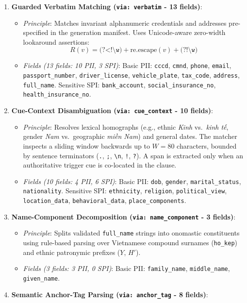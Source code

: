 \documentclass[
]{article}
\providecommand{\tightlist}{%
  \setlength{\itemsep}{0pt}\setlength{\parskip}{0pt}}
\begin{document}
\begin{enumerate}
\def\labelenumi{\arabic{enumi}.}
\tightlist
\item
  \textbf{Guarded Verbatim Matching (\texttt{via:\ verbatim} - 13
  fields)}:

  \begin{itemize}
  \tightlist
  \item
    \emph{Principle}: Matches invariant alphanumeric credentials and
    addresses pre-specified in the generation manifest. Uses
    Unicode-aware zero-width lookaround assertions:
    \[R(v) = \texttt{(?<!\textbackslash{}w)} + \text{re.escape}(v) + \texttt{(?!\textbackslash{}w)}\]
  \item
    \emph{Fields (13 fields: 10 PII, 3 SPI)}: Basic PII: \texttt{cccd},
    \texttt{cmnd}, \texttt{phone}, \texttt{email},
    \texttt{passport\_number}, \texttt{driver\_license},
    \texttt{vehicle\_plate}, \texttt{tax\_code}, \texttt{address},
    \texttt{full\_name}. Sensitive SPI: \texttt{bank\_account},
    \texttt{social\_insurance\_no}, \texttt{health\_insurance\_no}.
  \end{itemize}
\item
  \textbf{Cue-Context Disambiguation (\texttt{via:\ cue\_context} - 10
  fields)}:

  \begin{itemize}
  \tightlist
  \item
    \emph{Principle}: Resolves lexical homographs (e.g., ethnic
    \emph{Kinh} vs.~\emph{kinh tế}, gender \emph{Nam} vs.~geographic
    \emph{miền Nam}) and general dates. The matcher inspects a sliding
    window backwards up to \(W = 80\) characters, bounded by sentence
    terminators (\texttt{.}, \texttt{;}, \texttt{\textbackslash{}n},
    \texttt{!}, \texttt{?}). A span is extracted only when an
    authoritative trigger cue is co-located in the clause.
  \item
    \emph{Fields (10 fields: 4 PII, 6 SPI)}: Basic PII: \texttt{dob},
    \texttt{gender}, \texttt{marital\_status}, \texttt{nationality}.
    Sensitive SPI: \texttt{ethnicity}, \texttt{religion},
    \texttt{political\_view}, \texttt{location\_data},
    \texttt{behavioral\_data}, \texttt{place\_components}.
  \end{itemize}
\item
  \textbf{Name-Component Decomposition (\texttt{via:\ name\_component} -
  3 fields)}:

  \begin{itemize}
  \tightlist
  \item
    \emph{Principle}: Splits validated \texttt{full\_name} strings into
    onomastic constituents using rule-based parsing over Vietnamese
    compound surnames (\texttt{ho\_kep}) and ethnic patronymic prefixes
    (\(Y\), \(H'\)).
  \item
    \emph{Fields (3 fields: 3 PII, 0 SPI)}: Basic PII:
    \texttt{family\_name}, \texttt{middle\_name}, \texttt{given\_name}.
  \end{itemize}
\item
  \textbf{Semantic Anchor-Tag Parsing (\texttt{via:\ anchor\_tag} - 8
  fields)}:


\end{enumerate}
\end{document}
